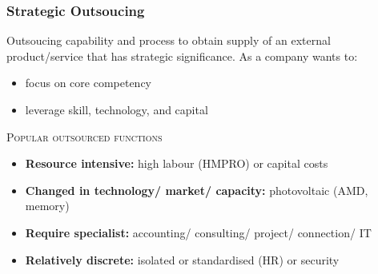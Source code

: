 \documentclass[10pt,presentation]{beamer}
\begin{document}
\begin{frame}
  \frametitle{Strategic Outsoucing}

  \begin{center} \small{
    \begin{block}{Outsoucing}
      capability and process to obtain supply of an external product/service that has strategic significance. As a company wants to:
        \begin{itemize}
          \item focus on \alert{core competency}
          \item leverage \alert{skill}, technology, and \alert{capital}
  \end{itemize}
    \end{block} }
  \end{center}

  \NextHalfLine
  \textsc{Popular outsourced functions}
  \begin{itemize}
    \item \textbf{Resource intensive:} high labour (HMPRO) or capital costs
    \item \textbf{Changed in technology/ market/ capacity:} photovoltaic (AMD, memory)
    \item \textbf{Require specialist:} accounting/ consulting/ project/ connection/ IT
    \item \textbf{Relatively discrete:} isolated or standardised (HR) or security
  \end{itemize}

\end{frame}
\end{document}
